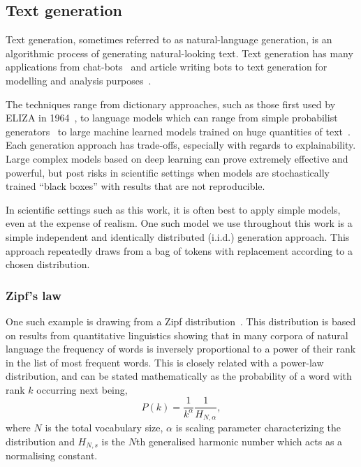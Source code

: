 \subsection{Text generation}\label{sec:textgeneration}

Text generation, sometimes referred to as natural-language generation, is an algorithmic process of generating natural-looking text. Text generation has many applications from chat-bots~\cite{MauldinChatterbots1994} and article writing bots to text generation for modelling and analysis purposes~\cite{Touseefsurvey2020}.

The techniques range from dictionary approaches, such as those first used by ELIZA in 1964~\cite{weizenbaum_computer_1976}, to language models which can range from simple probabilist generators~\cite{reiter2000building} to large machine learned models trained on huge quantities of text~\cite{perera2017recent}. Each generation approach has trade-offs, especially with regards to explainability. Large complex models based on deep learning can prove extremely effective and powerful, but post risks in scientific settings when models are stochastically trained ``black boxes'' with results that are not reproducible.

In scientific settings such as this work, it is often best to apply simple models, even at the expense of realism. One such model we use throughout this work is a simple independent and identically distributed (i.i.d.) generation approach. This approach repeatedly draws from a bag of tokens with replacement according to a chosen distribution. 

\subsubsection{Zipf's law}
One such example is drawing from a Zipf distribution~\cite{george1935zipf,zipf_human_1949}. This distribution is based on results from quantitative linguistics showing that in many corpora of natural language the frequency of words is inversely proportional to a power of their rank in the list of most frequent words. This is closely related with a power-law distribution, and can be stated mathematically as the probability of a word with rank $k$ occurring next being,
\begin{equation}
P(k) = \frac{1}{k^\alpha}\frac{1}{H_{N,\alpha}},
\end{equation}
where $N$ is the total vocabulary size, $\alpha$ is scaling parameter characterizing the distribution and $H_{N,s}$ is the $N$th generalised harmonic number which acts as a normalising constant. 

